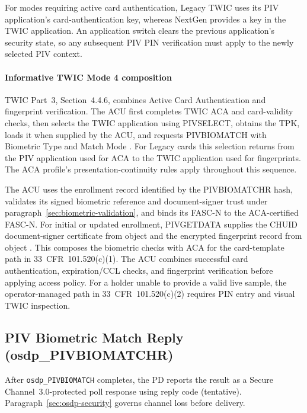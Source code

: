 For modes requiring active card authentication, Legacy TWIC uses its PIV
application's card-authentication key, whereas NextGen provides a key in the
TWIC application. An application switch clears the previous application's
security state, so any subsequent PIV PIN verification must apply to the
newly selected PIV context.

\paragraph{Informative TWIC Mode 4 composition}\label{sec:twic-mode4}
TWIC Part~3, Section~4.4.6, combines Active Card Authentication and fingerprint
verification. The ACU first completes TWIC ACA and card-validity checks, then
selects the TWIC application using PIVSELECT, obtains the TPK, loads it when
supplied by the ACU, and requests PIVBIOMATCH with Biometric Type 
and Match Mode . For Legacy cards this selection returns from the PIV
application used for ACA to the TWIC application used for fingerprints.
The ACA profile's presentation-continuity rules apply throughout this sequence.

The ACU uses the enrollment record identified by the PIVBIOMATCHR hash, validates
its signed biometric reference and document-signer trust under
paragraph~\ref{sec:biometric-validation}, and binds its FASC-N to the ACA-certified
FASC-N. For initial or updated enrollment, PIVGETDATA supplies the CHUID
document-signer certificate from object  and the encrypted
fingerprint record from object . This composes the biometric checks
with ACA for the card-template path in 33~CFR~101.520(c)(1). The ACU combines
successful card authentication, expiration/CCL checks, and fingerprint verification
before applying access policy.
For a holder unable to provide a valid live sample, the operator-managed path in
33~CFR~101.520(c)(2) requires PIN entry and visual TWIC inspection.

\subsection{PIV Biometric Match Reply (osdp\_PIVBIOMATCHR)}

After \texttt{osdp\_PIVBIOMATCH} completes, the PD reports the result as a
Secure Channel~3.0-protected poll response using reply code 
(tentative). Paragraph~\ref{sec:osdp-security} governs channel loss before delivery.



